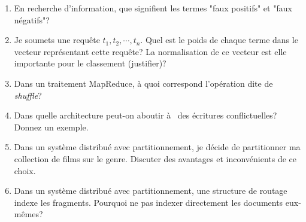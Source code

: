 \documentclass[10pt,a4paper]{article}
\begin{document}
\begin{enumerate}
 \item En recherche d'information, que signifient les termes "faux positifs"
      et "faux négatifs"?

\item Je soumets une requête $t_1, t_2, \cdots, t_n$. 
    Quel est le poids de chaque terme dans le vecteur représentant cette requête? 
    La normalisation de ce vecteur est elle importante pour le classement (justifier)?
  
    \item Dans un traitement MapReduce, à quoi correspond l'opération dite de \textit{shuffle}?
    
      \item Dans quelle architecture peut-on aboutir à  
      des écritures conflictuelles? Donnez un exemple.
    
    \item Dans un système distribué avec partitionnement, je
    décide de partitionner ma collection de films sur le genre. Discuter des avantages et inconvénients de ce choix.
    \item Dans un système distribué avec partitionnement, une structure de routage indexe les fragments. 
    Pourquoi ne pas indexer directement les documents eux-mêmes?
    
\end{enumerate}
\end{document}
